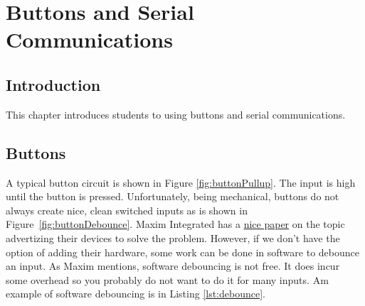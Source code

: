 \chapter{Buttons and Serial Communications}

\section{Introduction}
This chapter introduces students to using buttons and serial communications.

\section{Buttons}

A typical button circuit is shown in Figure \ref{fig:buttonPullup}. The input is high until the button is pressed.
Unfortunately, being mechanical, buttons do not always create nice, clean switched inputs as is shown in 
Figure~\ref{fig:buttonDebounce}. Maxim Integrated has a 
\href{https://www.maximintegrated.com/en/design/technical-documents/app-notes/2/287.html}{nice paper} on the topic
advertizing their devices to solve the problem. However, if we don't have the option of adding their hardware, some 
work can be done in software to debounce an input. As Maxim mentions, software debouncing is not free. It does incur
some overhead so you probably do not want to do it for many inputs. Am example of software debouncing is in 
Listing \ref{lst:debounce}.

